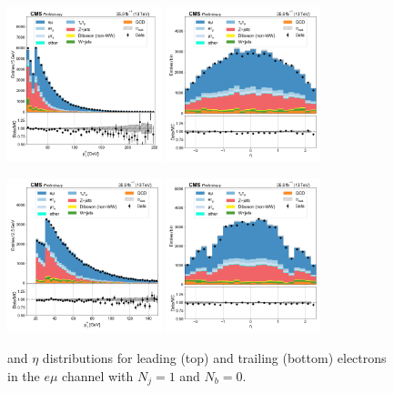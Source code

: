\begin{figure}[htb!]
    \centering
    \includegraphics[width=0.4\textwidth]{chapters/Appendix/sectionPlots/figures/data_mc_overlays/emu_2016_cat_eq1_eq0_a_signal_linear_lepton_lepton1_pt}
    \includegraphics[width=0.4\textwidth]{chapters/Appendix/sectionPlots/figures/data_mc_overlays/emu_2016_cat_eq1_eq0_a_signal_linear_lepton_lepton1_eta}

    \includegraphics[width=0.4\textwidth]{chapters/Appendix/sectionPlots/figures/data_mc_overlays/emu_2016_cat_eq1_eq0_a_signal_linear_lepton_lepton2_pt}
    \includegraphics[width=0.4\textwidth]{chapters/Appendix/sectionPlots/figures/data_mc_overlays/emu_2016_cat_eq1_eq0_a_signal_linear_lepton_lepton2_eta}
    \caption{\pt and $\eta$ distributions for leading (top) and trailing
        (bottom) electrons in the $e\mu$ channel with $N_{j} = 1$ and
        $N_{b} = 0$.}
    \label{fig:emu_2_kinematic}
\end{figure}

